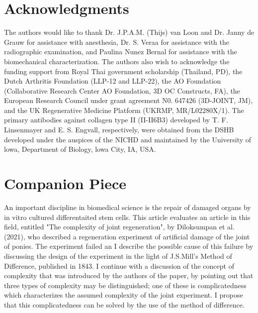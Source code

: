 \documentclass[twocolumn, empirical, authordate, issue]{jote-new-article}
\begin{document}
\setlength{\bibhang}{\parindent}

\printbibliography
\section{Acknowledgments} 

The authors would like to thank Dr. J.P.A.M. (Thijs) van Loon and Dr. Janny de Grauw for assistance with anesthesia, Dr. S. Veraa for assistance with the radiographic examination, and Paulina Nunez Bernal for assistance with the biomechanical characterization. The authors also wish to acknowledge the funding support from Royal Thai government scholarship (Thailand, PD), the Dutch Arthritis Foundation (LLP-12 and LLP-22), the AO Foundation (Collaborative Research Center AO Foundation, 3D OC Constructs, FA), the European Research Council under grant agreement N0. 647426 (3D-JOINT, JM), and the UK Regenerative Medicine Platform (UKRMP, MR/L02280X/1). The primary antibodies against collagen type II (II-II6B3) developed by T. F. Linsenmayer and E. S. Engvall, respectively, were obtained from the DSHB developed under the auspices of the NICHD and maintained by the University of lowa, Department of Biology, lowa City, IA, USA.
\section{Companion Piece} 

\noindent An important discipline in biomedical science is the repair of damaged organs by in vitro cultured differentaited stem cells. This article evaluates an article in this field, entitled "The complexity of joint regeneration", by Diloksumpan et al. (2021), who described a regeneration experiment of artificial damage of the joint of ponies. The experiment failed an I describe the possible cause of this failure by discussing the design of the experiment in the light of J.S.Mill's Method of Difference, published in 1843. I continue with a discussion of the concept of complexity that was introduced by the authors of the paper, by pointing out that three types of complexity may be distinguished; one of these is complicatedness which characterizes the assumed complexity of the joint experiment. I propose that this complicatedness can be solved by the use of the method of difference.
    \newpage
\end{document}
